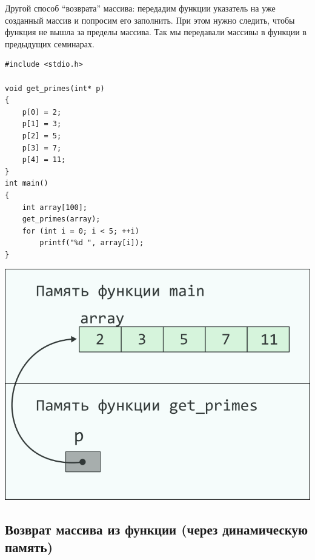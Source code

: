 \documentclass{article}
\begin{document}
Другой способ ``возврата'' массива: передадим функции указатель на
уже созданный массив и попросим его заполнить.
При этом нужно следить, чтобы функция не вышла за пределы массива.
Так мы передавали массивы в функции в предыдущих семинарах.
\begin{multicols}{2}
\begin{lstlisting}
#include <stdio.h>

void get_primes(int* p)
{
	p[0] = 2;
	p[1] = 3;
	p[2] = 5;
	p[3] = 7;
	p[4] = 11;	
}
int main()
{
	int array[100];
	get_primes(array);
	for (int i = 0; i < 5; ++i)
		printf("%d ", array[i]);
}
\end{lstlisting}
\columnbreak
\begin{center}
\includegraphics[scale=1]{../../images/pointer_schemes/function_return_arg_array.png}
\end{center}
\end{multicols}
\newpage
\subsection*{Возврат массива из функции (через динамическую память)}
\end{document}
